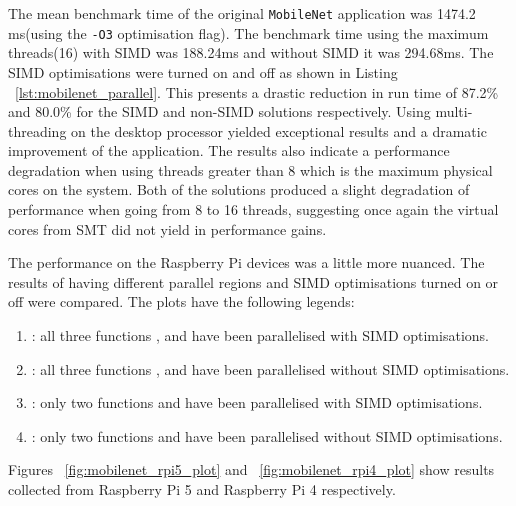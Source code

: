 The mean benchmark time of the original \texttt{MobileNet} application\cite{mobilenet_repo} was 1474.2 ms(using the \texttt{-O3} optimisation flag). The benchmark time using the maximum threads(16) with SIMD was 188.24ms and without SIMD it was 294.68ms. The SIMD optimisations were turned on and off as shown in Listing  ~\ref{lst:mobilenet_parallel}. This presents a drastic reduction in run time of 87.2\% and 80.0\% for the SIMD and non-SIMD solutions respectively. Using multi-threading on the desktop processor yielded exceptional results and a dramatic improvement of the application. The results also indicate a performance degradation when using threads greater than 8 which is the maximum physical cores on the system. Both of the solutions produced a slight degradation of performance when going from 8 to 16 threads, suggesting once again the virtual cores from SMT did not yield in performance gains. 

The performance on the Raspberry Pi devices was a little more nuanced. The results of having different parallel regions and SIMD optimisations turned on or off were compared. The plots have the following legends:

\begin{enumerate}
	\item \texttt{}: all three functions \texttt{}, \texttt{} and \texttt{} have been parallelised with SIMD optimisations.
	\item \texttt{}: all three functions \texttt{}, \texttt{} and \texttt{} have been parallelised without SIMD optimisations.
	\item \texttt{}: only two functions \texttt{} and \texttt{} have been parallelised with SIMD optimisations.
	\item \texttt{}: only two functions \texttt{} and \texttt{} have been parallelised without SIMD optimisations.
\end{enumerate}

Figures ~\ref{fig:mobilenet_rpi5_plot} and ~\ref{fig:mobilenet_rpi4_plot} show results collected from Raspberry Pi 5 and Raspberry Pi 4 respectively. 

